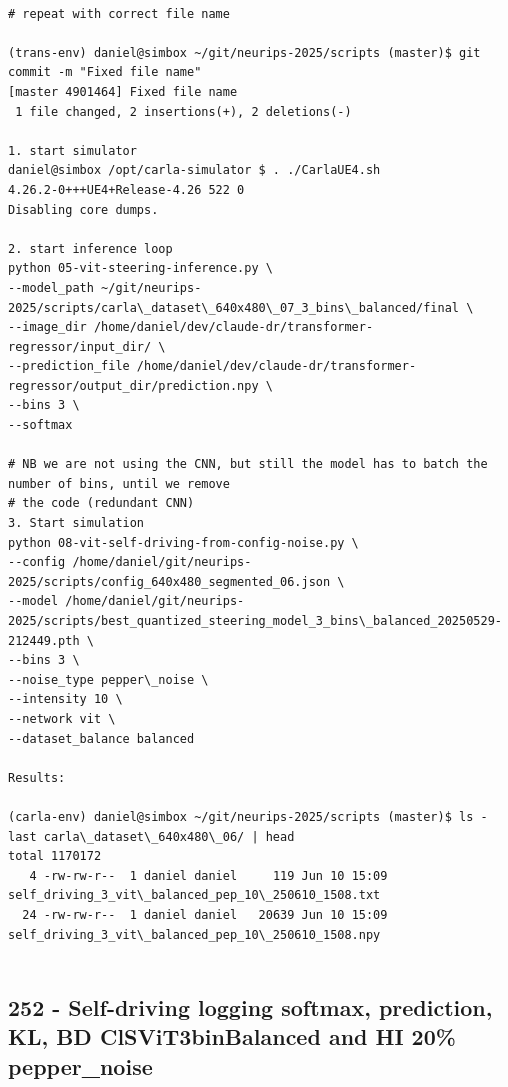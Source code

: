 \begin{verbatim}

# repeat with correct file name

(trans-env) daniel@simbox ~/git/neurips-2025/scripts (master)$ git commit -m "Fixed file name"
[master 4901464] Fixed file name
 1 file changed, 2 insertions(+), 2 deletions(-)
 
1. start simulator
daniel@simbox /opt/carla-simulator $ . ./CarlaUE4.sh 
4.26.2-0+++UE4+Release-4.26 522 0
Disabling core dumps.

2. start inference loop
python 05-vit-steering-inference.py \
--model_path ~/git/neurips-2025/scripts/carla\_dataset\_640x480\_07_3_bins\_balanced/final \
--image_dir /home/daniel/dev/claude-dr/transformer-regressor/input_dir/ \
--prediction_file /home/daniel/dev/claude-dr/transformer-regressor/output_dir/prediction.npy \
--bins 3 \
--softmax

# NB we are not using the CNN, but still the model has to batch the number of bins, until we remove
# the code (redundant CNN)
3. Start simulation
python 08-vit-self-driving-from-config-noise.py \
--config /home/daniel/git/neurips-2025/scripts/config_640x480_segmented_06.json \
--model /home/daniel/git/neurips-2025/scripts/best_quantized_steering_model_3_bins\_balanced_20250529-212449.pth \
--bins 3 \
--noise_type pepper\_noise \
--intensity 10 \
--network vit \
--dataset_balance balanced

Results:

(carla-env) daniel@simbox ~/git/neurips-2025/scripts (master)$ ls -last carla\_dataset\_640x480\_06/ | head
total 1170172
   4 -rw-rw-r--  1 daniel daniel     119 Jun 10 15:09 self_driving_3_vit\_balanced_pep_10\_250610_1508.txt
  24 -rw-rw-r--  1 daniel daniel   20639 Jun 10 15:09 self_driving_3_vit\_balanced_pep_10\_250610_1508.npy


\end{verbatim}

\subsection{252 - Self-driving logging softmax, prediction, KL, BD ClSViT3binBalanced and HI 20\% pepper\_noise}
\label{app_res:252}

